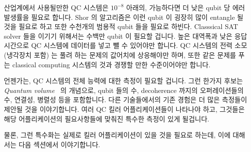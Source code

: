산업계에서 사용될만한 QC 시스템은 $10^{-8}$ 아래의, 가능하다면 더 낮은 qubit 당
에러 발생률을 필요로 합니다.
Shor 의 알고리즘은 이런 qubit 이 굉장히 많이 entangle 될 것을 필요로 하고 또한
수천개의 범용적 qubit 들을 필요로 하빈다.
Classsical SAT solver 들을 이기기 위해서는 수백만 qubit 이 필요할 겁니다.
높은 대역폭과 낮은 응답시간으로 QC 시스템에 데이터를 넣고 뺄 수 있어야만
합니다.
QC 시스템의 전력 소모 (냉각장치 포함) 는 풀려 하는 문제의 값어치에 상응해야만
하며, 또한 같은 문제를 푸는 classical computing 시스템의 것과 경쟁할 만한
수준이어야만 합니다.

언젠가는, QC 시스템의 전체 능력에 대한 측정이 필요할 겁니다.
그런 한가지 후보는 \emph{Quantum volume}~\cite{LevSBishop2017QuantumVolume} 의
개념으로, qubit 들의 수, decoherence 까지의 오퍼레이션들의 수, 연결성, 병렬성
등을 포함합니다.
다른 기술들에서의 기존 경험은 더 많은 측정들이 제안될 것을 이야기합니다.
여러 QC 킬러 어플리케이션들이 나타나야 하고, 그것들은 해당 어플리케이션의
필요사항들에 맞춰진 특수한 측정이 있게 될겁니다.

물론, 그런 특수화는 실제로 킬러 어플리케이션이 있을 것을 필요로 하는데, 이에
대해서는 다음 섹션에서 이야기합니다.


